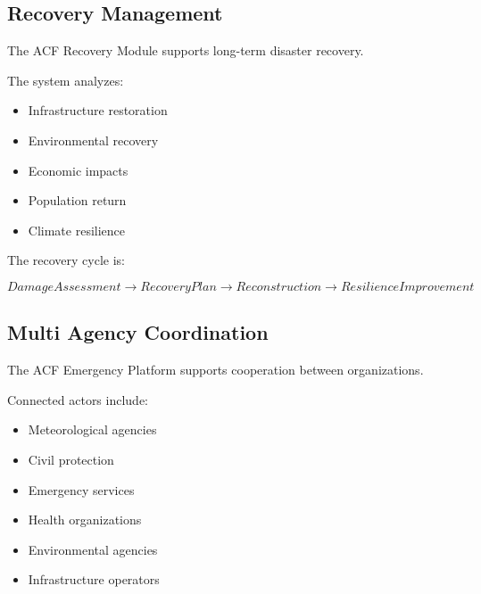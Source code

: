 
\subsection{Recovery Management}

The ACF Recovery Module supports long-term disaster recovery.

The system analyzes:

\begin{itemize}

\item Infrastructure restoration

\item Environmental recovery

\item Economic impacts

\item Population return

\item Climate resilience

\end{itemize}


The recovery cycle is:

\[
DamageAssessment
\rightarrow
RecoveryPlan
\rightarrow
Reconstruction
\rightarrow
ResilienceImprovement
\]



\subsection{Multi Agency Coordination}

The ACF Emergency Platform supports cooperation between organizations.

Connected actors include:

\begin{itemize}

\item Meteorological agencies

\item Civil protection

\item Emergency services

\item Health organizations

\item Environmental agencies

\item Infrastructure operators

\end{itemize}


